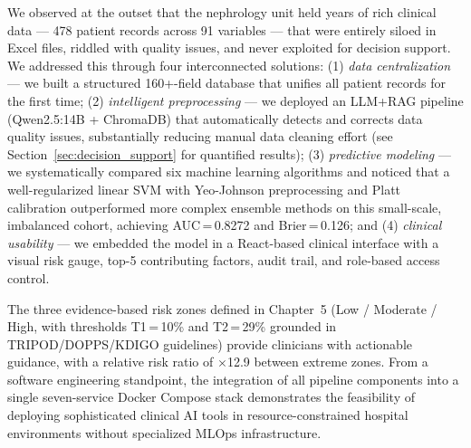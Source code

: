 \documentclass[12pt,a4paper,twoside]{report}
\begin{document}
We observed at the outset that the nephrology unit held years of rich clinical data — 478 patient records across 91 variables — that were entirely siloed in Excel files, riddled with quality issues, and never exploited for decision support. We addressed this through four interconnected solutions: (1) \textit{data centralization} — we built a structured 160+-field database that unifies all patient records for the first time; (2) \textit{intelligent preprocessing} — we deployed an LLM+RAG pipeline (Qwen2.5:14B + ChromaDB) that automatically detects and corrects data quality issues, substantially reducing manual data cleaning effort (see Section~\ref{sec:decision_support} for quantified results); (3) \textit{predictive modeling} — we systematically compared six machine learning algorithms and noticed that a well-regularized linear SVM with Yeo-Johnson preprocessing and Platt calibration outperformed more complex ensemble methods on this small-scale, imbalanced cohort, achieving AUC\,=\,0.8272 and Brier\,=\,0.126; and (4) \textit{clinical usability} — we embedded the model in a React-based clinical interface with a visual risk gauge, top-5 contributing factors, audit trail, and role-based access control.

The three evidence-based risk zones defined in Chapter~5 (Low / Moderate / High, with thresholds T1\,=\,10\% and T2\,=\,29\% grounded in TRIPOD/DOPPS/KDIGO guidelines) provide clinicians with actionable guidance, with a relative risk ratio of $\times$12.9 between extreme zones. From a software engineering standpoint, the integration of all pipeline components into a single seven-service Docker Compose stack demonstrates the feasibility of deploying sophisticated clinical AI tools in resource-constrained hospital environments without specialized MLOps infrastructure.
\end{document}
